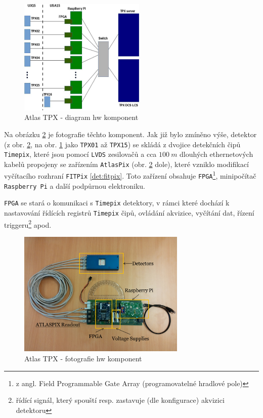 \begin{figure}[t]
	\begin{center}
		\includegraphics[width=6cm]{figures/tpx_hw_diagram.png}
		\caption{Atlas TPX - diagram hw komponent}
		\label{fig:tpx_hw_diagram}
	\end{center}
\end{figure}

Na obrázku \ref{fig:tpx_hw_foto} je fotografie  těchto komponent. Jak již bylo zmíněno výše, detektor (z obr. \ref{fig:tpx_hw_foto}, na obr. \ref{fig:tpx_hw_diagram} jako \texttt{TPX01} až \texttt{TPX15}) se skládá z dvojice detekčních čipů \texttt{Timepix}, které jsou pomocí \texttt{LVDS} zesilovačů a cca $100~m$ dlouhých ethernetových kabelů propojeny se zařízením \texttt{AtlasPix} (obr. \ref{fig:tpx_hw_foto} dole), které vzniklo modifikací vyčítacího rozhraní \texttt{FITPix} \ref{det:fitpix}. Toto zařízení obsahuje \texttt{FPGA}\footnote{z angl. Field Programmable Gate Array (programovatelné hradlové pole)}, minipočítač \texttt{Raspberry Pi} a další podpůrnou elektroniku. 

\texttt{FPGA} se stará o komunikaci s \texttt{Timepix} detektory, v rámci které dochází k nastavování řídících registrů \texttt{Timepix} čipů, ovládání akvizice, vyčítání dat, řízení triggeru\footnote{řídící signál, který spouští resp. zastavuje (dle konfigurace) akvizici detektoru} apod.

\begin{figure}[t]
	\begin{center}
		\includegraphics[width=8cm]{figures/tpx_hw_foto.png}
		\caption{Atlas TPX - fotografie hw komponent}
		\label{fig:tpx_hw_foto}
	\end{center}
\end{figure}

